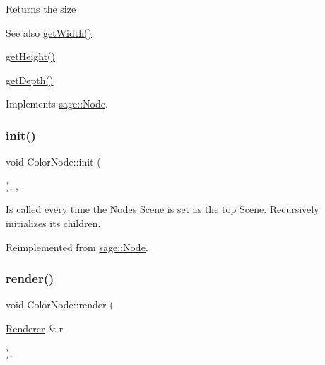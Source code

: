 \begin{DoxyReturn}{Returns}
the size 
\end{DoxyReturn}
\begin{DoxySeeAlso}{See also}
\mbox{\hyperlink{classsage_1_1Node_a65163ffabcfe9f482282ea37ead6fc5f}{get\+Width()}} 

\mbox{\hyperlink{classsage_1_1Node_a6af5a8378ac8d2c3490adbc2a03f1247}{get\+Height()}} 

\mbox{\hyperlink{classsage_1_1Node_a5c4c28939c7adf7e4a65dbb02c0cbcd3}{get\+Depth()}} 
\end{DoxySeeAlso}


Implements \mbox{\hyperlink{classsage_1_1Node_ad14a04d08b5261c27d3080f6a5e12836}{sage\+::\+Node}}.

\mbox{\label{classsage_1_1ColorNode_a1a5a055be2cc8d15b38c5c25eb489e94}} 
\subsubsection{\texorpdfstring{init()}{init()}}
{\footnotesize\ttfamily void Color\+Node\+::init (\begin{DoxyParamCaption}{ }\end{DoxyParamCaption})\hspace{0.3cm}{\ttfamily [override]}, {\ttfamily [protected]}, {\ttfamily [virtual]}}



Is called every time the \mbox{\hyperlink{classsage_1_1Node}{Node}}\textquotesingle{}s \mbox{\hyperlink{classsage_1_1Scene}{Scene}} is set as the top \mbox{\hyperlink{classsage_1_1Scene}{Scene}}. Recursively initializes its children. 



Reimplemented from \mbox{\hyperlink{classsage_1_1Node_ab87776adae83149e235e37ed469f4e10}{sage\+::\+Node}}.

\mbox{\label{classsage_1_1ColorNode_ac2cf18feb8ab4e55dd68ca8b0c4faabf}} 
\subsubsection{\texorpdfstring{render()}{render()}}
{\footnotesize\ttfamily void Color\+Node\+::render (\begin{DoxyParamCaption}\item[{\mbox{\hyperlink{classsage_1_1Renderer}{Renderer}} \&}]{r }\end{DoxyParamCaption})\hspace{0.3cm}{\ttfamily [override]}, {\ttfamily [virtual]}}




